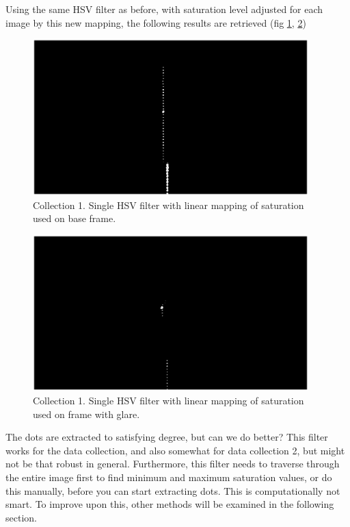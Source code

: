 Using the same HSV filter as before, with saturation level adjusted for each image by this new mapping, the following results are retrieved (fig \ref{fig:hsv_filt_both_base}, \ref{fig:hsv_filt_both_glare})
\begin{figure}[h]
    \centering
        \includegraphics[width=0.95\textwidth]{figures/ImageAnalysis/filtered_base1_hsv_both.eps}
        \caption{Collection 1. Single HSV filter with linear mapping of saturation used on base frame.}
    \label{fig:hsv_filt_both_base}
\end{figure}
\begin{figure}[h]
\centering
    \includegraphics[width=0.95\textwidth]{figures/ImageAnalysis/filtered_glare1_hsv_both.eps}
        \caption{Collection 1. Single HSV filter with linear mapping of saturation used on frame with glare.}
        \label{fig:hsv_filt_both_glare}
\end{figure}
\FloatBarrier
The dots are extracted to satisfying degree, but can we do better? This filter works for the data collection, and also somewhat for data collection 2, but might not be that robust in general. Furthermore, this filter needs to traverse through the entire image first to find minimum and maximum saturation values, or do this manually, before you can start extracting dots. This is computationally not smart. To improve upon this, other methods will be examined in the following section. 


